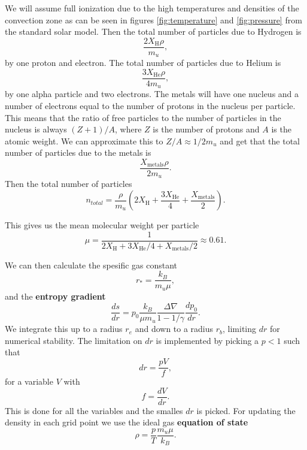 We will assume full ionization due to the high temperatures and densities of the convection zone as can be seen in figures \ref{fig:temperature} and \ref{fig:pressure} from the standard solar model. Then the total number of particles due to Hydrogen is 
\begin{equation*}
    \frac{2X_\text{H}\rho}{m_u},
\end{equation*}
by one proton and electron. The total number of particles due to Helium is
\begin{equation*}
    \frac{3 X_\text{He}\rho}{4 m_u},
\end{equation*}
by one alpha particle and two electrons. The metals will have one nucleus and a number of electrons equal to the number of protons in the nucleus per particle. This means that the ratio of free particles to the number of particles in the nucleus is always $(Z+1)/A$, where $Z$ is the number of protons and $A$ is the atomic weight. We can approximate this to $Z/A\approx 1/2m_u$ and get that the total number of particles due to the metals is
\begin{equation*}
    \frac{X_\text{metals}\rho}{2m_u}.
\end{equation*}
Then the total number of particles
\begin{equation*}
    n_{total} = \frac{\rho}{m_u}\left( 2X_\text{H} + \frac{3 X_\text{He}}{4} + \frac{X_\text{metals}}{2} \right).
\end{equation*}

This gives us the mean molecular weight per particle
\begin{equation}
    \mu = \frac{1}{2X_\text{H} + 3X_\text{He}/4 + X_\text{metals}/2}\approx 0.61.
\end{equation}

We can then calculate the spesific gas constant 
    \begin{equation*}
        r_* = \frac{k_B}{m_u \mu},
    \end{equation*}
and the \textbf{entropy gradient}
    \begin{equation}\label{eq:entropy_gradient}
        \frac{ds}{dr} = p_0 \frac{k_B}{\mu m_u}\frac{\Delta\nabla}{1-1/\gamma}\frac{dp_0}{dr}.
    \end{equation}
We integrate this up to a radius $r_e$ and down to a radius $r_b$, limiting $dr$ for numerical stability. The limitation on $dr$ is implemented by picking a $p<1$ such that 
    \begin{equation*}
        dr = \frac{pV}{f},
    \end{equation*}
for a variable $V$ with
    \begin{equation*}
        f = \frac{dV}{dr}.
    \end{equation*}
This is done for all the variables and the smalles $dr$ is picked. For updating the density in each grid point we use the ideal gas \textbf{equation of state}
    \begin{equation}\label{eq:eos}
        \rho = \frac{p}{T}\frac{m_u \mu}{k_B}.
    \end{equation}

